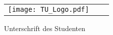 \begin{titlepage}
	
	\begin{tabular}{lcr}
		\texttt{[image: TU\_Logo.pdf]} & %
		\hspace{1cm} \trunititel \hspace{2.5cm} &
		\\
	\end{tabular}

\begin{flushleft}
	Unterschrift des Studenten
\end{flushleft}
	
		\titlepagedecoration
	\end{titlepage}

